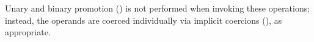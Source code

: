 
%

Unary and binary promotion () is not performed
when invoking these
operations; instead, the operands are coerced individually via implicit
coercions (), as appropriate.


